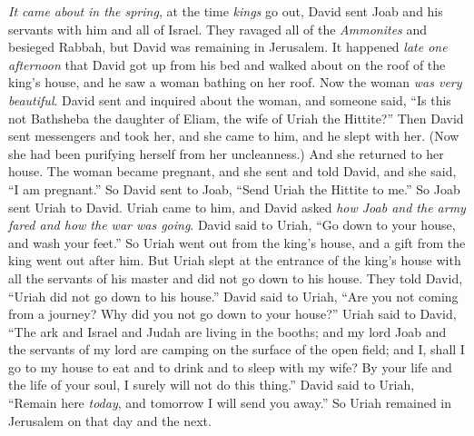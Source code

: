 \begin{biblechapter} %
 \textit{It came about in the spring}, at the time \textit{kings} go out, David sent Joab and his servants with him and all of Israel. They ravaged all of the \textit{Ammonites} and besieged Rabbah, but David was remaining in Jerusalem.
\verse It happened \textit{late one afternoon} that David got up from his bed and walked about on the roof of the king’s house, and he saw a woman bathing on her roof. Now the woman \textit{was very beautiful}.
\verse David sent and inquired about the woman, and someone said, “Is this not Bathsheba the daughter of Eliam, the wife of Uriah the Hittite?”
\verse Then David sent messengers and took her, and she came to him, and he slept with her. (Now she had been purifying herself from her uncleanness.) And she returned to her house.
\verse The woman became pregnant, and she sent and told David, and she said, “I am pregnant.”
\verse So David sent to Joab, “Send Uriah the Hittite to me.” So Joab sent Uriah to David.
\verse Uriah came to him, and David asked \textit{how Joab and the army fared and how the war was going}.
\verse David said to Uriah, “Go down to your house, and wash your feet.” So Uriah went out from the king’s house, and a gift from the king went out after him.
\verse But Uriah slept at the entrance of the king’s house with all the servants of his master and did not go down to his house.
\verse They told David, “Uriah did not go down to his house.” David said to Uriah, “Are you not coming from a journey? Why did you not go down to your house?”
\verse Uriah said to David, “The ark and Israel and Judah are living in the booths; and my lord Joab and the servants of my lord are camping on the surface of the open field; and I, shall I go to my house to eat and to drink and to sleep with my wife? By your life and the life of your soul, I surely will not do this thing.”
\verse David said to Uriah, “Remain here \textit{today}, and tomorrow I will send you away.” So Uriah remained in Jerusalem on that day and the next.

\end{biblechapter}
